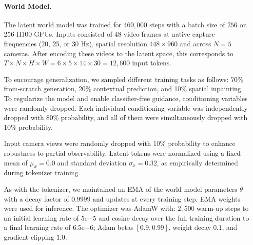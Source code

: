 \paragraph{World Model.} The latent world model was trained for $460{\scriptstyle,}000$ steps with a batch size of $256$ on 256 H100 GPUs. Inputs consisted of $48$ video frames at native capture frequencies (20, 25, or 30 Hz), spatial resolution $448 \times 960$ and across $N=5$ cameras. After encoding these videos to the latent space, this corresponds to $T\times N \times H \times W = 6 \times 5 \times 14 \times 30 = 12{\scriptstyle,}600$ input tokens.

To encourage generalization, we sampled different training tasks as follows:
70\% from-scratch generation, 20\% contextual prediction, and 10\% spatial inpainting. To regularize the model and enable classifier-free guidance, conditioning variables were randomly dropped. Each individual conditioning variable was independently dropped with 80\% probability, and all of them were simultaneously dropped with 10\% probability. 

Input camera views were randomly dropped with 10\% probability to enhance robustness to partial observability.
Latent tokens were normalized using a fixed mean of $\mu_x = 0.0$ and standard deviation $\sigma_x = 0.32$, as empirically determined during tokenizer training.

As with the tokenizer, we maintained an EMA of the world model parameters $\theta$ with a decay factor of $0.9999$ and updates at every training step. EMA weights were used for inference. The optimizer was AdamW with: $2{\scriptstyle,}500$ warm-up steps to an initial learning rate of $5\mathrm{e}{-5}$ and cosine decay over the full training duration to a final learning rate of $6.5\mathrm{e}{-6}$; Adam betas $[0.9, 0.99]$, weight decay $0.1$, and gradient clipping $1.0$.
